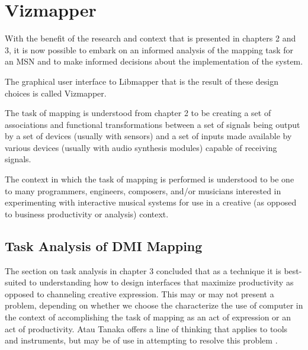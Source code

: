 \resetdatestamp

\chapter{Vizmapper}

With the benefit of the research and context that is presented in chapters 2 and 3, it is now possible to embark on an informed analysis of the mapping task for an MSN and to make informed decisions about the implementation of the system.

The graphical user interface to Libmapper that is the result of these design choices is called Vizmapper.

The task of mapping is understood from chapter 2 to be creating a set of associations and functional transformations between a set of signals being output by a set of devices (usually with sensors) and a set of inputs made available by various devices (usually with audio synthesis modules)  capable of receiving signals.

The context in which the task of mapping is performed is understood to be one to many programmers, engineers, composers, and/or musicians interested in experimenting with interactive musical systems for use in a creative (as opposed to business productivity or analysis) context.

\section{Task Analysis of DMI Mapping}

The section on task analysis in chapter 3 concluded that as a technique it is best-suited to understanding how to design interfaces that maximize productivity as opposed to channeling creative expression. This may or may not present a problem, depending on whether we choose the characterize the use of computer in the context of accomplishing the task of mapping as an act of expression or an act of productivity. Atau Tanaka offers a line of thinking that applies to tools and instruments, but may be of use in attempting to resolve this problem \cite{tanaka2000}.

